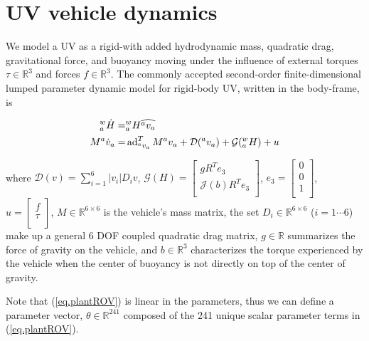 \section{UV vehicle dynamics}


We model a UV as a rigid-\body with added hydrodynamic mass, quadratic
drag, gravitational force, and buoyancy moving under the influence of
external torques $\tau \in \mathbb{R}^{3}$ and forces $f \in
\mathbb{R}^{3}$. The commonly accepted second-order finite-dimensional
lumped parameter dynamic model for rigid-body UV,
written in the body-frame, is 
\vspace*{-5mm}

\begin{align} \label{eq.plantROV}
{^w_a}\dot{H}=&{^w_a}H \widehat{{^a}v_a}
\nonumber \\
  M{^a}\dot{v}_a=&\operatorname{ad}_{{^a}v_a}^T M {^a}v_a+\mathcal{D}({^a}v_a)+\mathcal{G}({^w_a}H)+u 
\end{align}

\noindent where
%
%
$\mathcal{D}(v)=\sum_{i=1}^6 |v_i|D_i v$,
$\mathcal{G}(H)=\left[ \begin{array}{c} g R^T e_3 \\ \mathcal{J}(b)R^T
    e_3 \\ \end{array}\right]$,
$e_3=\left[ \begin{array}{c} 0\\ 0\\
    1\\ \end{array}\right]$, $u=\left[ \begin{array}{c} f \\ \tau
    \\ \end{array}\right]$, $M\in \mathbb{R}^{6 \times 6}$ is the
vehicle's mass matrix, the set $D_i\in \mathbb{R}^{6 \times 6}$
($i=1\cdots6$) make up a general 6 DOF coupled quadratic drag matrix,
$g\in \mathbb{R}$ summarizes the force of gravity on the vehicle, and
$b\in\mathbb{R}^3$ characterizes the torque experienced by the vehicle
when the center of buoyancy is not directly on top of the center of
gravity.%


Note that (\ref{eq.plantROV}) is linear in the parameters, thus we
can define a parameter vector, $\theta\in\mathbb{R}^{241}$ composed of
the 241 unique scalar parameter terms in (\ref{eq.plantROV}).   
